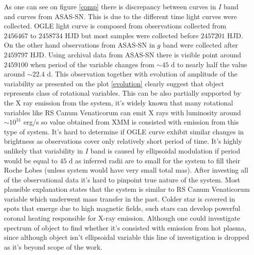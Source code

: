 \documentclass{pracalicmgr}
\begin{document}
\hspace{1cm} As one can see on figure \ref{comp} there is discrepancy between curves in $I$ band and curves from ASAS-SN. This is due to the different time light curves were collected. OGLE 
light curve is composed from observations collected from $2456467$ to $2458734$ HJD but most samples were collected before $2457201$ HJD. On the other hand
observations from ASAS-SN in $g$ band were collected after $2459797$ HJD. Using archival data from ASAS-SN there is visible point around $2459100$ when period of the 
variable changes from $\sim 45$ d to nearly half the value around $\sim22.4$ d. This observation together with evolution of amplitude of the variability as presented on the
plot \ref{evolution} clearly suggest that object represents class of rotational variables. This can be also partially supported by the X ray emission from the system, 
it's widely known that many rotational variables like RS Canum Venaticorum can emit X rays with luminosity around $\sim 10^{31}$ erg/s  \citep{walter_x-rays_1980} so value obtained from XMM 
is consisted with emission from this type of system. It's hard to determine if OGLE curve exhibit similar changes in brightness as observations cover only relatively short period of time.
It's highly unlikely that variability in $I$ band is caused by ellipsoidal modulation if period would be equal to $45$ d as inferred radii are to small for the system to fill their Roche Lobes 
(unless system would have very small total mas). After investing all of the observational data it's hard to pinpoint true nature of the system. Most plausible 
explanation states that the system is similar to RS Canum Venaticorum variable which underwent mass transfer in the past. Colder star is covered in spots 
that emerge due to high magnetic fields, such stars can develop powerful coronal heating responsible for X-ray emission. Although one could investigate spectrum 
of object to find whether it's consisted with emission from hot plasma, since although object isn't ellipsoidal variable this line of investigation is dropped as it's beyond
scope of the work.%
\end{document}
